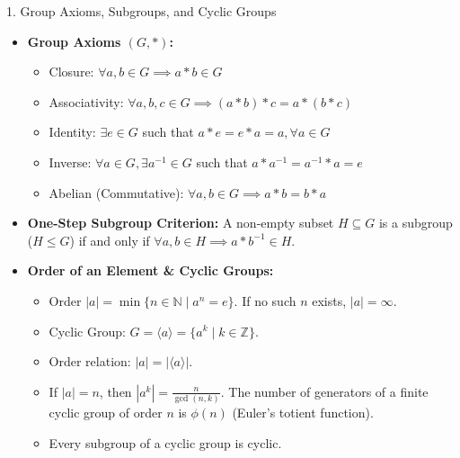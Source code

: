 \documentclass[11pt,a4paper]{article}
\begin{document}
\begin{formulabox}{1. Group Axioms, Subgroups, and Cyclic Groups}
\begin{itemize}
    \item \textbf{Group Axioms $(G, *)$:}
    \begin{itemize}
        \item Closure: $\forall a, b \in G \implies a * b \in G$
        \item Associativity: $\forall a, b, c \in G \implies (a * b) * c = a * (b * c)$
        \item Identity: $\exists e \in G$ such that $a * e = e * a = a, \forall a \in G$
        \item Inverse: $\forall a \in G, \exists a^{-1} \in G$ such that $a * a^{-1} = a^{-1} * a = e$
        \item Abelian (Commutative): $\forall a, b \in G \implies a * b = b * a$
    \end{itemize}
    \item \textbf{One-Step Subgroup Criterion:} A non-empty subset $H \subseteq G$ is a subgroup ($H \le G$) if and only if $\forall a, b \in H \implies a * b^{-1} \in H$.
    \item \textbf{Order of an Element \& Cyclic Groups:}
    \begin{itemize}
        \item Order $|a| = \min\{n \in \mathbb{N} \mid a^n = e\}$. If no such $n$ exists, $|a| = \infty$.
        \item Cyclic Group: $G = \langle a \rangle = \{a^k \mid k \in \mathbb{Z}\}$.
        \item Order relation: $|a| = |\langle a \rangle|$.
        \item If $|a| = n$, then $|a^k| = \frac{n}{\gcd(n, k)}$. The number of generators of a finite cyclic group of order $n$ is $\phi(n)$ (Euler's totient function).
        \item Every subgroup of a cyclic group is cyclic.
    \end{itemize}
\end{itemize}
\end{formulabox}

\vspace{0.2cm}
\end{document}
